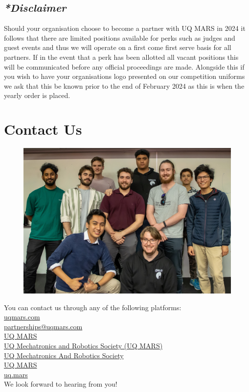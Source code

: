 \documentclass[a4paper,12pt]{report}
\begin{document}
\subsection{\textit{*Disclaimer}}
Should your organisation choose to become a partner with UQ MARS in 2024 it follows that there are limited positions available for perks such as judges and guest events and thus we will operate on a first come first serve basis for all partners. If in the event that a perk has been allotted all vacant positions this will be communicated before any official proceedings are made. Alongside this if you wish to have your organisations logo presented on our competition uniforms we ask that this be known prior to the end of February 2024 as this is when the yearly order is placed.

\newpage

\section*{Contact Us}
\begin{figure}[H]
    \centering
    \includegraphics[width=0.9\linewidth]{Photos/Exec.jpg}
\end{figure}

\large
\onehalfspacing
You can contact us through any of the following platforms: \\
\faLink{} \href{https://www.uqmars.com}{uqmars.com} \\
\faEnvelope{} \href{mailto:partnerships@uqmars.com}{partnerships@uqmars.com} \\
\faFacebookSquare{} \href{https://facebook.com/UQMARS}{UQ MARS} \\
\faLinkedinSquare{} \href{https://linkedin.com/company/uq-mars}{UQ Mechatronics and Robotics Society (UQ MARS)} \\
\faGithubSquare{} \href{https://github.com/uqmars}{UQ Mechatronics And Robotics Society} \\
\faYoutubePlay{} \href{https://www.youtube.com/channel/UCH3GjoKLL3R_1ayjkn9C78A}{UQ MARS} \\
\faInstagram{} \href{https://www.instagram.com/uq.mars/}{uq.mars} \\
We look forward to hearing from you!
\end{document}
